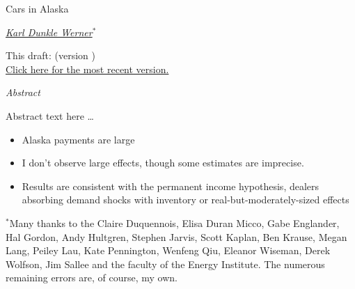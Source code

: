 \documentclass[11pt,letterpaper,oneside]{article}
\begin{document}
\thispagestyle{empty}
\setcounter{page}{0}
\vspace*{0.7in plus 0.3in minus 0.3in}

\begin{center}
    {\Huge Cars in Alaska}

    \href{mailto:karldw@berkeley.edu}{\textit{\Large Karl Dunkle Werner}}$^*$

\vspace{1em}
  This draft: \gitCommitterDate{} (version
    \href{https://github.com/karldw/second_year_paper/tree/\gitHash}{
    \textsc{\gitAbbrevHash{}}})\\
    \href{http://karldw.org/second_year_paper.pdf}{Click here for the most recent version.}
\end{center}

\vspace{2in plus 1in minus 0.7in}

\begin{center}
    \begin{minipage}{0.7\linewidth}
        \begin{center}
            \textit{Abstract}
        \end{center}
        Abstract text here \ldots
        \begin{itemize}
            \item Alaska payments are large
            \item I don't observe large effects, though some estimates are imprecise.
            \item Results are consistent with the permanent income hypothesis, dealers absorbing demand shocks with inventory or real\hyp{}but\hyp{}moderately\hyp{}sized effects
        \end{itemize}
    \end{minipage}
\end{center}

\vspace{3in plus 2in minus 1.7in}
{\footnotesize
\noindent
$^*$Many thanks to the Claire Duquennois, Elisa Duran Micco, Gabe Englander, Hal Gordon, Andy Hultgren, Stephen Jarvis, Scott Kaplan, Ben Krause, Megan Lang, Peiley Lau, Kate Pennington, Wenfeng Qiu, Eleanor Wiseman, Derek Wolfson, Jim Sallee and the faculty of the Energy Institute.
The numerous remaining errors are, of course, my own.
}
\end{document}
